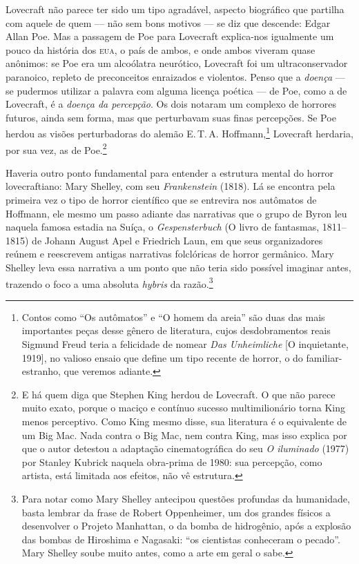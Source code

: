 Lovecraft não parece ter sido um tipo agradável, aspecto biográfico que
partilha com aquele de quem --- não sem bons motivos --- se diz que
descende: Edgar Allan Poe. Mas a passagem de Poe para
Lovecraft explica-nos igualmente um pouco da história dos \textsc{eua}, o país de
ambos, e onde ambos viveram quase anônimos: se Poe era um alcoólatra
neurótico, Lovecraft foi um ultraconservador paranoico, repleto de
preconceitos enraizados e violentos. Penso que a \emph{doença} --- se
pudermos utilizar a palavra com alguma licença poética --- de Poe, como a
de Lovecraft, é a \emph{doença da percepção}. Os dois notaram um complexo
de horrores futuros, ainda sem forma, mas que perturbavam suas finas
percepções. Se Poe herdou as visões perturbadoras do alemão E.\,T.\,A.
Hoffmann,\footnote{Contos como ``Os autômatos'' e ``O homem da areia'' são duas das mais importantes
  peças desse gênero de literatura, cujos desdobramentos reais Sigmund
  Freud teria a felicidade de nomear \emph{Das Unheimliche} [O inquietante,
  1919], no valioso ensaio que define um tipo recente de horror, o do
  familiar-estranho, que veremos adiante.} Lovecraft herdaria, por sua
vez, as de Poe.\footnote{E há quem diga que Stephen King herdou de
  Lovecraft. O que não parece muito exato, porque o maciço e contínuo
  sucesso multimilionário torna King menos perceptivo. Como King mesmo
  disse, sua literatura é o equivalente de um Big Mac. Nada contra o Big
  Mac, nem contra King, mas isso explica por que o autor detestou a
  adaptação cinematográfica do seu \emph{O iluminado} (1977) por Stanley Kubrick naquela obra-prima de 1980: sua percepção,
  como artista, está limitada aos efeitos, não vê estrutura.}

Haveria outro ponto fundamental para entender a estrutura
mental do horror lovecraftiano: Mary Shelley, com seu
\emph{Frankenstein} (1818). Lá se encontra pela primeira vez o tipo de
horror científico que se entrevira nos autômatos de Hoffmann, ele mesmo
um passo adiante das narrativas que o grupo de Byron leu naquela famosa
estadia na Suíça, o \emph{Gespensterbuch} (O livro de fantasmas, 1811--1815)
de Johann August Apel e Friedrich Laun, em que seus organizadores reúnem
e reescrevem antigas narrativas folclóricas de horror germânico. Mary
Shelley leva essa narrativa a um ponto que não teria sido possível imaginar
antes, trazendo o foco a uma absoluta \emph{hybris} da razão.\footnote{Para
  notar como Mary Shelley antecipou questões profundas da humanidade,
  basta lembrar da frase de Robert Oppenheimer, um dos
  grandes físicos a desenvolver o Projeto Manhattan, o da bomba de
  hidrogênio, após a explosão das bombas de Hiroshima e Nagasaki: ``os
  cientistas conheceram o pecado''. Mary Shelley soube muito antes,
  como a arte em geral o sabe.}


